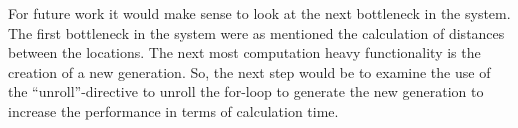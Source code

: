 For future work it would make sense to look at the next bottleneck in the system. The first bottleneck in the system were as mentioned the calculation of distances between the locations. The next most computation heavy functionality is the creation of a new generation. So, the next step would be to examine the use of the “unroll”-directive to unroll the for-loop to generate the new generation to increase the performance in terms of calculation time. 